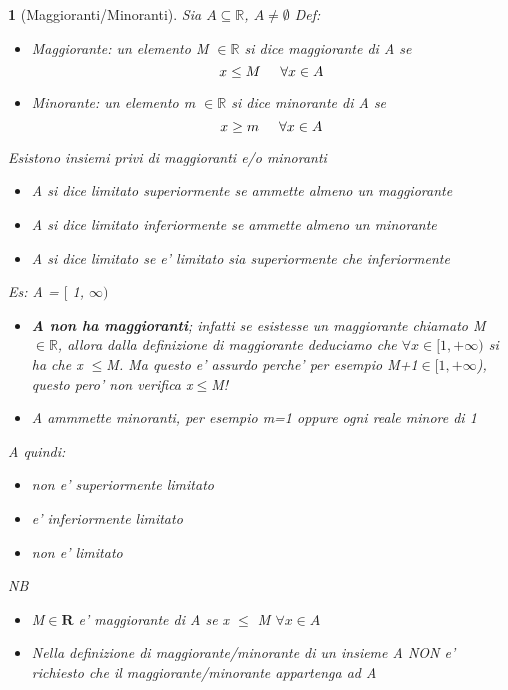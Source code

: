 \documentclass{book}
\theoremstyle{mystyle}
\newtheorem*{mydefinition}{}
\begin{document}
 \begin{mydefinition}[Maggioranti/Minoranti]
     Sia $A\subseteq \mathds{R}$, $A\neq \emptyset$ \newline Def: \begin{itemize}
         \item Maggiorante: un elemento M $\in \mathds{R}$ si dice maggiorante di A se $$x \leq M \hspace{0.5 cm} \forall x \in A$$
         \item Minorante: un elemento m $\in \mathds{R}$ si dice minorante di A se $$x \geq m \hspace{0.5 cm} \forall x \in A$$
     \end{itemize}
     \vspace{0.5cm}
     Esistono insiemi privi di maggioranti e/o minoranti
     \begin{itemize}
         \item A si dice \emph{limitato superiormente} se ammette almeno un maggiorante
         \item A si dice \emph{limitato inferiormente} se ammette almeno un minorante
         \item A si dice \emph{limitato} se e' limitato sia superiormente che inferiormente
     \end{itemize}
     \newline
     Es: \newline
     A = $[$ 1, $\infty)$
     \begin{itemize}
         \item \textbf{A non ha maggioranti}; infatti se esistesse un maggiorante chiamato M $\in \mathds{R}$, allora dalla definizione di maggiorante deduciamo che $\forall x \in [1,+ \infty)$ si ha che x $\leq$M. Ma questo e' assurdo perche' per esempio M+1$\in[1,+\infty$), questo pero' non verifica x$\leq$M!
         \item A ammmette minoranti, per esempio m=1 oppure ogni reale minore di 1
     \end{itemize}
     A quindi: \begin{itemize}
         \item non e' superiormente limitato
         \item e' inferiormente limitato
         \item non e' limitato
     \end{itemize}

     \emph{NB} \begin{itemize}
         \item M$\in \mathbf{R}$ e' maggiorante di A se x $\leq$ M $\forall x \in A$
         \item Nella definizione di maggiorante/minorante di un insieme A \emph{NON e' richiesto} che il maggiorante/minorante \emph{appartenga} ad A
     \end{itemize}
 \end{mydefinition}
\end{document}
